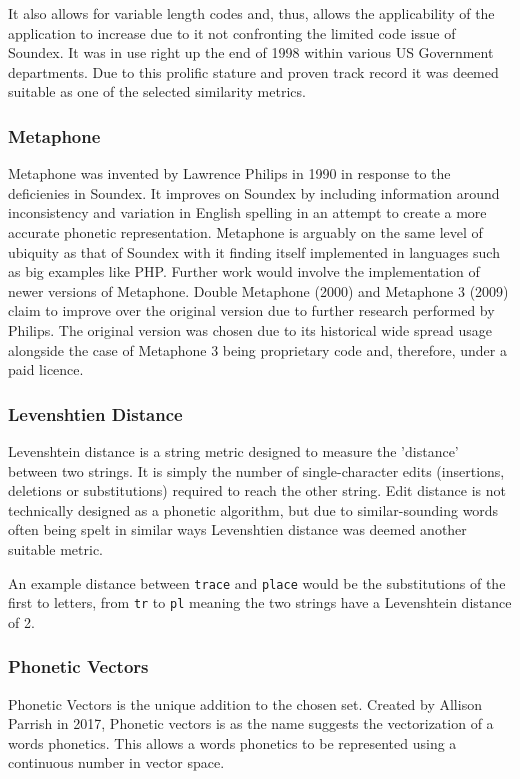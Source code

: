 It also allows for variable length codes and, thus, allows the applicability of the application to increase due to it not confronting the limited code issue of Soundex. It was in use right up the end of 1998 within various US Government departments. Due to this prolific stature and proven track record it was deemed suitable as one of the selected similarity metrics.

\subsubsection{Metaphone}
Metaphone was invented by Lawrence Philips in 1990\cite{philips1990hanging} in response to the deficienies in Soundex. It improves on Soundex by including information around inconsistency and variation in English spelling in an attempt to create a more accurate phonetic representation. Metaphone is arguably on the same level of ubiquity as that of Soundex with it finding itself implemented in languages such as big examples like PHP\cite{php}. Further work would involve the implementation of newer versions of Metaphone. Double Metaphone (2000) and Metaphone 3 (2009) claim to improve over the original version due to further research performed by Philips. The original version was chosen due to its historical wide spread usage alongside the case of Metaphone 3 being proprietary code and, therefore, under a paid licence.

\subsubsection{Levenshtien Distance}
Levenshtein distance is a string metric designed to measure the 'distance' between two strings. It is simply the number of single-character edits (insertions, deletions or substitutions) required to reach the other string. Edit distance is not technically designed as a phonetic algorithm, but due to similar-sounding words often being spelt in similar ways\cite{hettiarachchi2012sparcl} Levenshtien distance was deemed another suitable metric.

An example distance between \verb|trace| and \verb|place| would be the substitutions of the first to letters, from \verb|tr| to \verb|pl| meaning the two strings have a Levenshtein distance of 2.

\subsubsection{Phonetic Vectors}
Phonetic Vectors is the unique addition to the chosen set. Created by Allison Parrish in 2017\cite{parrish2017poetic}, Phonetic vectors is as the name suggests the vectorization of a words phonetics. This allows a words phonetics to be represented using a continuous number in vector space.

